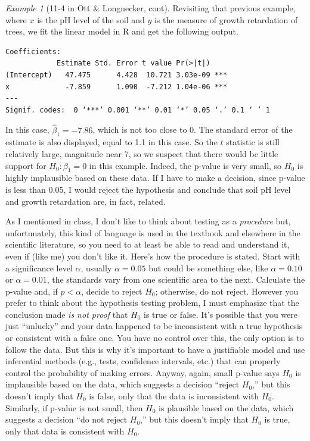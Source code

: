 \documentclass[a4paper, 12pt]{article}
\theoremstyle{plain}
\theoremstyle{definition}
\theoremstyle{remark}
\newtheorem*{example}{Example}
\begin{document}
\begin{example}[11-4 in Ott \& Longnecker, cont]
Revisiting that previous example, where $x$ is the pH level of the soil and $y$ is the measure of growth retardation of trees, we fit the linear model in R and get the following output.  
{\small 
\begin{verbatim}
Coefficients:
            Estimate Std. Error t value Pr(>|t|)    
(Intercept)   47.475      4.428  10.721 3.03e-09 ***
x             -7.859      1.090  -7.212 1.04e-06 ***
---
Signif. codes:  0 ‘***’ 0.001 ‘**’ 0.01 ‘*’ 0.05 ‘.’ 0.1 ‘ ’ 1
\end{verbatim}
}
In this case, $\hat\beta_1=-7.86$, which is not too close to 0.  The standard error of the estimate is also displayed, equal to 1.1 in this case.  So the $t$ statistic is still relatively large, magnitude near 7, so we suspect that there would be little support for $H_0: \beta_1=0$ in this example.  Indeed, the p-value is very small, so $H_0$ is highly implausible based on these data.  If I have to make a decision, since p-value is less than 0.05, I would reject the hypothesis and conclude that soil pH level and growth retardation are, in fact, related.  
\end{example}

As I mentioned in class, I don't like to think about testing as a {\em procedure} but, unfortunately, this kind of language is used in the textbook and elsewhere in the scientific literature, so you need to at least be able to read and understand it, even if (like me) you don't like it.  Here's how the procedure is stated.  Start with a significance level $\alpha$, usually $\alpha=0.05$ but could be something else, like $\alpha=0.10$ or $\alpha=0.01$, the standards vary from one scientific area to the next.  Calculate the p-value and, if $p < \alpha$, decide to reject $H_0$; otherwise, do not reject.  However you prefer to think about the hypothesis testing problem, I must emphasize that the conclusion made {\em is not proof} that $H_0$ is true or false.  It's possible that you were just ``unlucky'' and your data happened to be inconsistent with a true hypothesis or consistent with a false one.  You have no control over this, the only option is to follow the data.  But this is why it's important to have a justifiable model and use inferential methods (e.g., tests, confidence intervals, etc.) that can properly control the probability of making errors.  Anyway, again, small p-value says $H_0$ is implausible based on the data, which suggests a decision ``reject $H_0$,'' but this doesn't imply that $H_0$ is false, only that the data is inconsistent with $H_0$.  Similarly, if p-value is not small, then $H_0$ is plausible based on the data, which suggests a decision ``do not reject $H_0$,'' but this doesn't imply that $H_0$ is true, only that data is consistent with $H_0$. 
\end{document}

